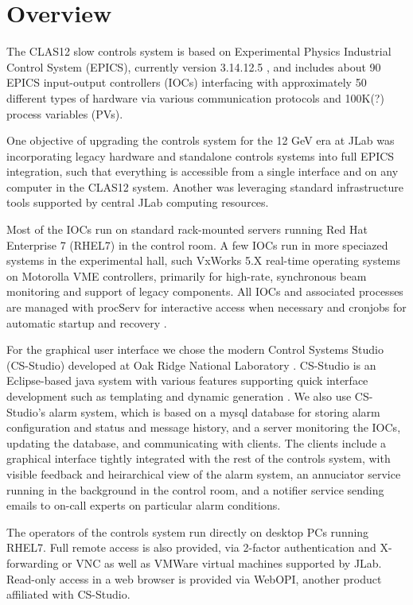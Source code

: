 \section{Overview}

The CLAS12 slow controls system is based on Experimental Physics Industrial Control System (EPICS), currently version 3.14.12.5 \cite{epics-website}, and includes about 90 EPICS input-output controllers (IOCs) interfacing with approximately 50 different types of hardware via various communication protocols and 100K(?) process variables (PVs).

One objective of upgrading the controls system for the 12 GeV era at JLab was incorporating legacy hardware and standalone controls systems into full EPICS integration, such that everything is accessible from a single interface and on any computer in the CLAS12 system.  Another was leveraging standard infrastructure tools supported by central JLab computing resources.

Most of the IOCs run on standard rack-mounted servers running Red Hat Enterprise 7 (RHEL7) in the control room.  A few IOCs run in more speciazed systems in the experimental hall, such VxWorks 5.X real-time operating systems on Motorolla VME controllers, primarily for high-rate, synchronous beam monitoring and support of legacy components.  All IOCs and associated processes are managed with procServ for interactive access when necessary and cronjobs for automatic startup and recovery \cite{procserv-website}.

For the graphical user interface we chose the modern Control Systems Studio (CS-Studio) developed at Oak Ridge National Laboratory \cite{css-website}.   CS-Studio is an Eclipse-based java system with various features supporting quick interface development such as templating and dynamic generation \cite{css-website}.  We also use CS-Studio's alarm system, which is based on a mysql database for storing alarm configuration and status and message history, and a server monitoring the IOCs, updating the database, and communicating with clients.  The clients include a graphical interface tightly integrated with the rest of the controls system, with visible feedback and heirarchical view of the alarm system, an annuciator service running in the background in the control room, and a notifier service sending emails to on-call experts on particular alarm conditions.

The operators of the controls system run directly on desktop PCs running RHEL7.  Full remote access is also provided, via 2-factor authentication and X-forwarding or VNC as well as VMWare virtual machines supported by JLab.  Read-only access in a web browser is provided via WebOPI, another product affiliated with CS-Studio.

